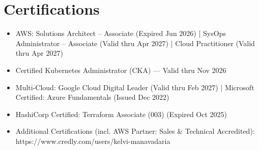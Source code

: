 \documentclass[a4paper,10.999999pt]{article}
\begin{document}

    \section{Certifications}

    \begin{itemize}[leftmargin=1.35em, itemsep=0.35pt, topsep=0.3pt, parsep=0pt, label=\raisebox{0.25ex}{\tiny$\circ$}]
    \item AWS: Solutions Architect – Associate (Expired Jun 2026) | SysOps Administrator – Associate (Valid thru Apr 2027) | Cloud Practitioner (Valid thru Apr 2027)
    \item Certified Kubernetes Administrator (CKA) — Valid thru Nov 2026
    \item Multi-Cloud: Google Cloud Digital Leader (Valid thru Feb 2027) | Microsoft Certified: Azure Fundamentals (Issued Dec 2022)
    \item HashiCorp Certified: Terraform Associate (003) (Expired Oct 2025)
    \item Additional Certifications (incl. AWS Partner: Sales \& Technical Accredited): https://www.credly.com/users/kelvi-manavadaria
    \end{itemize}

    
\end{document}
